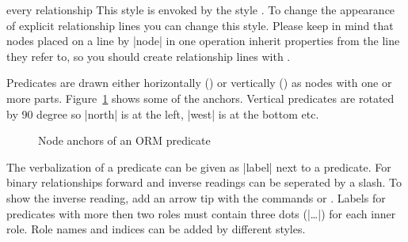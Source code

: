 \documentclass[a4paper,10pt]{article}
\begin{document}
\begin{stylekey}{every relationship}
  This style is envoked by the style . To change the appearance of explicit relationship lines you can change this style. Please keep in mind that nodes placed on a line by |node| in one operation inherit properties from  the line they refer to, so you should create relationship lines with .
\begin{codeexample}[width=3cm]
\end{codeexample}
\end{stylekey}

\noindent
Predicates are drawn either horizontally () or vertically () as nodes with one or more parts. Figure~\ref{fig:hanchors} shows some of the anchors. Vertical predicates are rotated by 90 degree so |north| is at the left, |west| is at the bottom etc.

\begin{figure}[h]
\centering
\begin{codeexample}[width=10cm]
\Large
{}
\end{codeexample}
\caption{Node anchors of an ORM predicate}
\label{fig:hanchors}
\end{figure}

\noindent
The verbalization of a predicate can be given as |label| next to a predicate. For binary relationships forward and inverse readings can be seperated by a slash. To show the inverse reading, add an arrow tip with the commands  or . Labels for predicates with more then two roles must contain three dots (|\ldots|) for each inner role. Role names and indices can be added by different styles.
\end{document}
